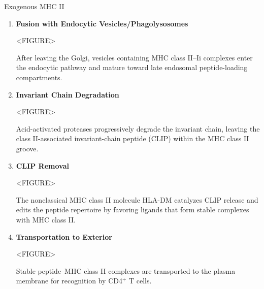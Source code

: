 \begin{core}[label=core:exogenous_mhcii]{Exogenous MHC II}
\begin{enumerate}[label=(\arabic*)]
\begin{enumerate}
          \end{enumerate}

        \item \textbf{Fusion with Endocytic Vesicles/Phagolysosomes}

          <FIGURE>

          After leaving the Golgi, vesicles containing MHC class II--Ii complexes enter the endocytic pathway and mature toward late endosomal peptide-loading compartments.

        \item \textbf{Invariant Chain Degradation}

          <FIGURE>

          Acid-activated proteases progressively degrade the invariant chain, leaving the class II-associated invariant-chain peptide (CLIP) within the MHC class II groove.

        \item \textbf{CLIP Removal}

          <FIGURE>

          The nonclassical MHC class II molecule HLA-DM catalyzes CLIP release and edits the peptide repertoire by favoring ligands that form stable complexes with MHC class II.

        \item \textbf{Transportation to Exterior}

          <FIGURE>

          Stable peptide--MHC class II complexes are transported to the plasma membrane for recognition by CD4$^+$ T cells.

      \end{enumerate}

    \end{core}

